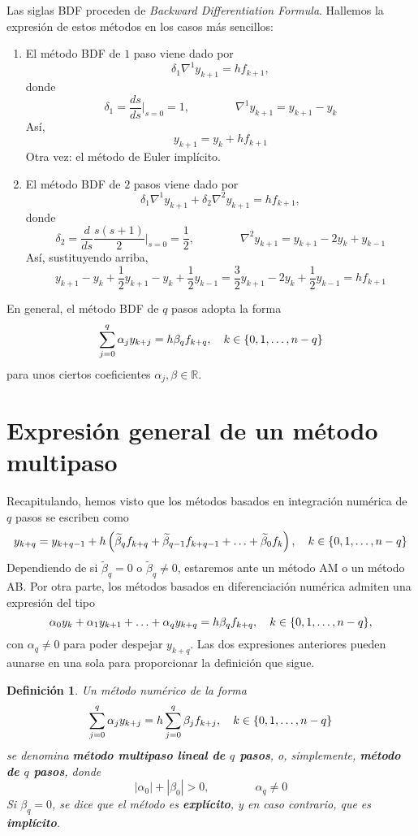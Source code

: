 \documentclass[11pt]{report}
\theoremstyle{mytheorem}
\theoremstyle{mydefinition}
\newtheorem{definition}{Definición}
\theoremstyle{myexample}
\newenvironment{cdefinition} %
  {\begin{mdframed}[
        linewidth=3pt,
        linecolor=c1,
        bottomline=false,
        topline=false,
        rightline=false,
        innerrightmargin=0pt,
        innertopmargin=0pt,
        innerbottommargin=0pt,
        innerleftmargin=1em, %
        skipabove=\baselineskip]
    \begin{definition}}
  {\end{definition}\end{mdframed}}
\newcommand{\R}{\mathbb R}
\newcommand{\mybf}[1]{\boldmath\textbf{\color{c1}#1}\unboldmath}
\begin{document}
Las siglas BDF proceden de \emph{Backward Differentiation Formula}. Hallemos la expresión de estos métodos en los casos más sencillos:
\begin{enumerate}
    \item El método BDF de $1$ paso viene dado por
    \[\delta_1\nabla^1y_{k+1} = hf_{k+1},\]
    donde
    \[\delta_1 = \frac{ds}{ds}\Biggr|_{s=0} = 1, \qquad \qquad \nabla^1y_{k+1} = y_{k+1}-y_k\]
    Así,
    \[y_{k+1} = y_k+hf_{k+1}\]
    Otra vez: el método de Euler implícito.
    \item El método BDF de $2$ pasos viene dado por
    \[\delta_1\nabla^1y_{k+1} +\delta_2\nabla^2y_{k+1} = hf_{k+1},\]
    donde
    \[\delta_2 = \frac{d}{ds}\frac{s(s+1)}{2}\Biggr|_{s=0} = \frac{1}{2}, \qquad \qquad \nabla^2y_{k+1} = y_{k+1}-2y_k+y_{k-1}\]
    Así, sustituyendo arriba,
    \[y_{k+1}-y_k+\frac{1}{2}y_{k+1}-y_k+\frac{1}{2}y_{k-1}= \frac{3}{2}y_{k+1}-2y_k+\frac{1}{2}y_{k-1} = hf_{k+1}\]
\end{enumerate}

En general, el método BDF de $q$ pasos adopta la forma
\[\sum_{j=0}^q \alpha_jy_{k+j} =  h\beta_q f_{k+q}, \quad k \in \{0,1,\mathellipsis,n-q\}\]
para unos ciertos coeficientes $\alpha_j, \beta \in \R$.

\section{Expresión general de un método multipaso}

Recapitulando, hemos visto que los métodos basados en integración numérica de $q$ pasos se escriben como
\[y_{k+q} = y_{k+q-1}+h\left(\widetilde{\beta}_qf_{k+q}+\widetilde{\beta}_{q-1}f_{k+q-1}+\mathellipsis+\widetilde{\beta}_0f_k\right), \quad k \in \{0,1,\mathellipsis,n-q\}\]
Dependiendo de si $\widetilde{\beta}_q = 0$ o $\widetilde{\beta}_q \neq 0$, estaremos ante un método AM o un método AB. Por otra parte, los métodos basados en diferenciación numérica admiten una expresión del tipo
\[\alpha_0y_k+\alpha_1y_{k+1}+\mathellipsis+\alpha_qy_{k+q} = h\beta_qf_{k+q}, \quad k \in \{0,1,\mathellipsis,n-q\},\]
con $\alpha_q \neq 0$ para poder despejar $y_{k+q}$. Las dos expresiones anteriores pueden aunarse en una sola para proporcionar la definición que sigue.

\begin{cdefinition}
Un método numérico de la forma
\[\sum_{j=0}^q \alpha_j y_{k+j} = h\sum_{j=0}^q \beta_j f_{k+j}, \quad k \in \{0,1,\mathellipsis,n-q\}\]
se denomina \mybf{método multipaso lineal de $q$ pasos}, o, simplemente, \mybf{método de $q$ pasos}, donde
\[|\alpha_0|+|\beta_0| > 0, \qquad \qquad \alpha_q \neq 0\]
Si $\beta_q = 0$, se dice que el método es \mybf{explícito}, y en caso contrario, que es \mybf{implícito}.
\end{cdefinition}
\end{document}
